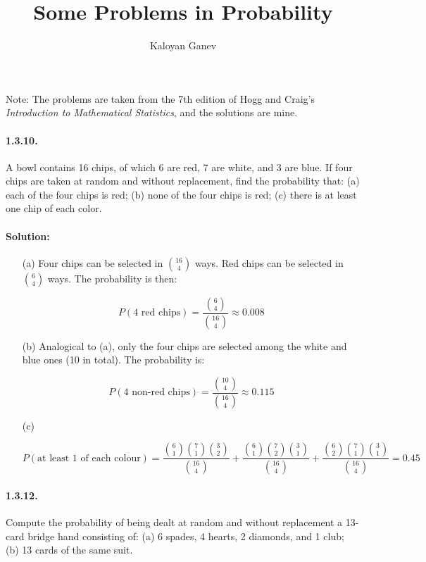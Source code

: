 \documentclass[12pt,a4paper]{article}
\begin{document}
\title{Some Problems in Probability}
\author{Kaloyan Ganev}
\date{\empty}
\maketitle

Note: The problems are taken from the 7th edition of Hogg and Craig's \textit{Introduction to Mathematical Statistics}, and the solutions are mine.

\onehalfspacing
\paragraph{1.3.10.} A bowl contains 16 chips, of which 6 are red, 7 are white, and 3 are blue. If four chips are taken at random and without replacement, find the probability that:
(a) each of the four chips is red; (b) none of the four chips is red; (c) there is at least one chip of each color.

\paragraph{Solution:}
\begin{itemize}
	\item[(a)] Four chips can be selected in $16 \choose 4$ ways. Red chips can be selected in $6 \choose 4$ ways. The probability is then:
	
	\[
		P(\textrm{4 red chips}) = \displaystyle\frac{{6 \choose 4}}{{16 \choose 4}} \approx 0.008
	\]
	
	\item[(b)] Analogical to (a), only the four chips are selected among the white and blue ones (10 in total). The probability is:
	
	\[
		P(\textrm{4 non-red chips}) = \displaystyle\frac{{10 \choose 4}}{{16 \choose 4}} \approx 0.115
	\]
	
	\item[(c)] 
	
	\[
		P(\textrm{at least 1 of each colour}) = \displaystyle\frac{{6 \choose 1}{7 \choose 1}{3 \choose 2}}{{16 \choose 4}} + \frac{{6 \choose 1}{7 \choose 2}{3 \choose 1}}{{16 \choose 4}} + \frac{{6 \choose 2}{7 \choose 1}{3 \choose 1}}{{16 \choose 4}} = 0.45
	\]
\end{itemize} 

\paragraph{1.3.12.} Compute the probability of being dealt at random and without replacement a 13-card bridge hand consisting of: (a) 6 spades, 4 hearts, 2 diamonds, and 1 club; (b) 13 cards of the same suit.
\end{document}
